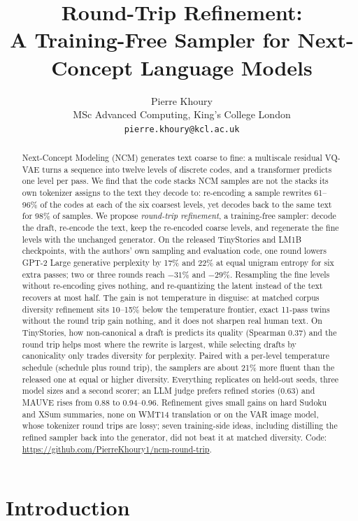 \documentclass[10pt]{article}
\title{Round-Trip Refinement:\\A Training-Free Sampler for Next-Concept Language Models}
\author{Pierre Khoury\\{\small MSc Advanced Computing, King's College London}\\{\small\texttt{pierre.khoury@kcl.ac.uk}}}
\date{}
\begin{document}
\maketitle

\begin{abstract}
Next-Concept Modeling (NCM) generates text coarse to fine: a multiscale residual VQ-VAE turns a sequence into twelve levels of discrete codes, and a transformer predicts one level per pass. We find that the code stacks NCM samples are not the stacks its own tokenizer assigns to the text they decode to: re-encoding a sample rewrites 61--96\% of the codes at each of the six coarsest levels, yet decodes back to the same text for 98\% of samples. We propose \emph{round-trip refinement}, a training-free sampler: decode the draft, re-encode the text, keep the re-encoded coarse levels, and regenerate the fine levels with the unchanged generator. On the released TinyStories and LM1B checkpoints, with the authors' own sampling and evaluation code, one round lowers GPT-2 Large generative perplexity by 17\% and 22\% at equal unigram entropy for six extra passes; two or three rounds reach $-31\%$ and $-29\%$. Resampling the fine levels without re-encoding gives nothing, and re-quantizing the latent instead of the text recovers at most half. The gain is not temperature in disguise: at matched corpus diversity refinement sits 10--15\% below the temperature frontier, exact 11-pass twins without the round trip gain nothing, and it does not sharpen real human text. On TinyStories, how non-canonical a draft is predicts its quality (Spearman 0.37) and the round trip helps most where the rewrite is largest, while selecting drafts by canonicality only trades diversity for perplexity. Paired with a per-level temperature schedule (schedule plus round trip), the samplers are about 21\% more fluent than the released one at equal or higher diversity. Everything replicates on held-out seeds, three model sizes and a second scorer; an LLM judge prefers refined stories (0.63) and MAUVE rises from 0.88 to 0.94--0.96. Refinement gives small gains on hard Sudoku and XSum summaries, none on WMT14 translation or on the VAR image model, whose tokenizer round trips are lossy; seven training-side ideas, including distilling the refined sampler back into the generator, did not beat it at matched diversity. Code: \url{https://github.com/PierreKhoury1/ncm-round-trip}.
\end{abstract}

\section{Introduction}
\end{document}
